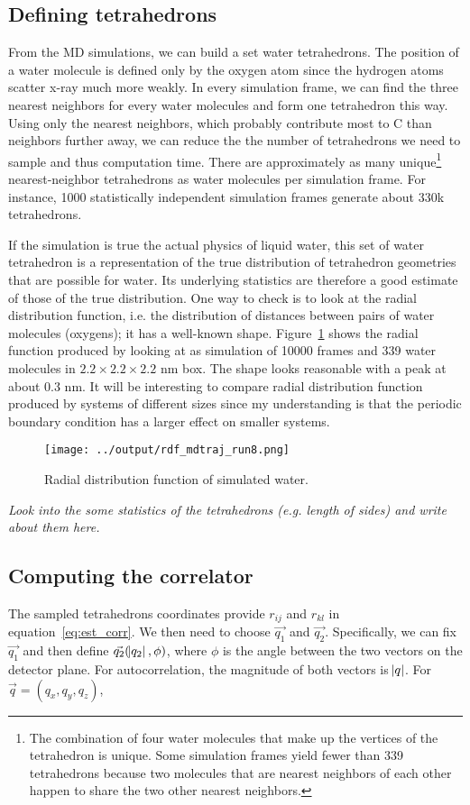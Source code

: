 \documentclass[20pt]{article}
\begin{document}
\subsection{Defining tetrahedrons}
From the MD simulations, we can build a set water tetrahedrons. The position of a water molecule is defined only by the oxygen atom since the hydrogen atoms scatter x-ray much more weakly. In every simulation frame, we can find the three nearest neighbors for every water molecules and form one tetrahedron this way. Using only the nearest neighbors, which probably contribute most to C than neighbors further away, we can reduce the the number of tetrahedrons we need to sample and thus computation time. There are approximately as many unique\footnote{The combination of four water molecules that make up the vertices of the tetrahedron is unique. Some simulation frames yield fewer than 339 tetrahedrons because two molecules that are nearest neighbors of each other happen to share the two other nearest neighbors.} nearest-neighbor tetrahedrons as water molecules per simulation frame. For instance, 1000 statistically independent simulation frames generate about 330k tetrahedrons. 

If the simulation is true the actual physics of liquid water, this set of water tetrahedron is a representation of the true distribution of tetrahedron geometries that are possible for water. Its underlying statistics are therefore a good estimate of those of the true distribution. One way  to check is to look at the radial distribution function, i.e. the distribution of distances between pairs of water molecules (oxygens); it has a well-known shape. Figure~\ref{fig:rdf_mdtraj} shows the radial function produced by looking at as simulation of 10000 frames and 339 water molecules in $2.2\times2.2\times2.2$ nm box. The shape looks reasonable with a peak at about 0.3 nm. It will be interesting to compare radial distribution function produced by systems of different sizes since my understanding is that the periodic boundary condition has a larger effect on smaller systems.
\begin{figure}[!h] 
  \centering
    \texttt{[image: ../output/rdf\_mdtraj\_run8.png]}
     \caption{Radial distribution function of simulated water.} \label{fig:rdf_mdtraj}
\end{figure}

{\it Look into the some statistics of the tetrahedrons (e.g. length of sides) and write about them here. }

\subsection{Computing the correlator}
The sampled tetrahedrons coordinates provide $r_{ij}$ and $r_{kl}$ in equation~\ref{eq:est_corr}. We then need to choose $\vec{q_1}$ and $\vec{q_2}$. Specifically, we can fix $\vec{q_1}$ and then define $\vec{q_2}(\abs{q_2},\phi)$, where $\phi$ is the angle between the two vectors on the detector plane. For autocorrelation, the magnitude of both vectors is $\abs{q}$. For $\vec{q} = (q_x,q_y,q_z)$,
\end{document}
